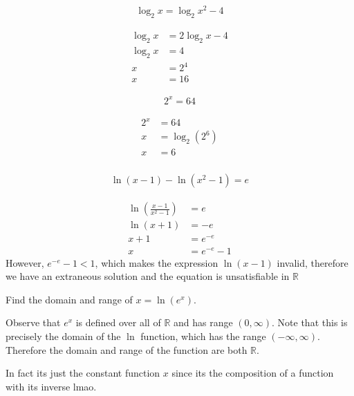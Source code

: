 \documentclass[a4paper]{article}
\begin{document}
\begin{question}
\begin{align*}
\log_2 x  = \log_2 x^2 -4
\end{align*}
\end{question}

\begin{align*}
\log_2 x &= 2 \log_2 x - 4 \\
\log_2 x &= 4 \\
x &= 2^4 \\
x &= 16
\end{align*}

\begin{question}
\begin{align*}
2^x = 64
\end{align*}
\end{question}

\begin{align*}
2^x &= 64 \\
x &= \log_2(2^6) \\
x &= 6 \\
\end{align*}

\begin{question}
\begin{align*}
\ln(x-1) - \ln(x^2-1) = e
\end{align*}
\end{question}

\begin{align*}
\ln\left(\frac{x-1}{x^2-1}\right) &= e \\
\ln(x+1) &= -e \\
x+1 &= e^{-e} \\
x &= e^{-e} -1
\end{align*}
However, \(e^{-e} -1 < 1\), which makes the expression \(\ln(x-1)\) invalid, therefore we have an extraneous solution and the equation is unsatisfiable in \(\mathbb{R}\)

\begin{question}
Find the domain and range of \(x = \ln(e^x)\).
\end{question}

Observe that \(e^x\) is defined over all of \(\mathbb{R}\) and has range \((0, \infty)\). Note that this is precisely the domain of the \(\ln\) function, which has the range \((-\infty, \infty)\). Therefore the domain and range of the function are both \(\mathbb{R}\).

In fact its just the constant function \(x\) since its the composition of a function with its inverse lmao.
\end{document}
